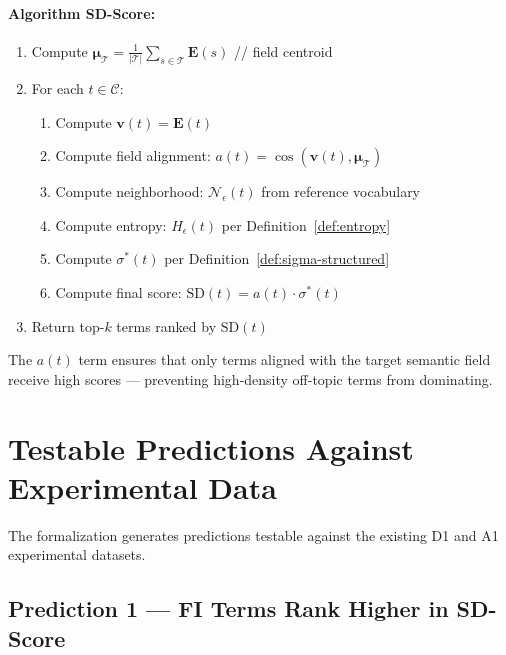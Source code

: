 \documentclass[11pt,a4paper]{article}
\begin{document}
\paragraph{Algorithm SD-Score:}
\begin{enumerate}
  \item Compute $\boldsymbol{\mu}_\mathcal{T} = \frac{1}{|\mathcal{T}|} \sum_{s \in \mathcal{T}} \mathbf{E}(s)$ \hfill // field centroid

  \item For each $t \in \mathcal{C}$:
  \begin{enumerate}
    \item Compute $\mathbf{v}(t) = \mathbf{E}(t)$
    \item Compute field alignment: $a(t) = \cos(\mathbf{v}(t), \boldsymbol{\mu}_\mathcal{T})$
    \item Compute neighborhood: $\mathcal{N}_\epsilon(t)$ from reference vocabulary
    \item Compute entropy: $H_\epsilon(t)$ per Definition~\ref{def:entropy}
    \item Compute $\sigma^*(t)$ per Definition~\ref{def:sigma-structured}
    \item Compute final score: $\text{SD}(t) = a(t) \cdot \sigma^*(t)$
  \end{enumerate}

  \item Return top-$k$ terms ranked by $\text{SD}(t)$
\end{enumerate}

The $a(t)$ term ensures that only terms aligned with the target semantic field
receive high scores — preventing high-density off-topic terms from dominating.

\section{Testable Predictions Against Experimental Data}
\label{sec:predictions}

The formalization generates predictions testable against the existing D1 and
A1 experimental datasets.

\subsection{Prediction 1 — FI Terms Rank Higher in SD-Score}
\end{document}
